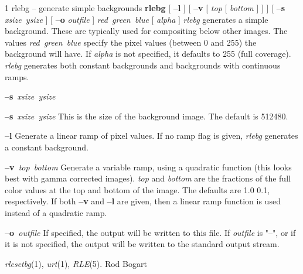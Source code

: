%
%
%
 1
rlebg -- generate simple backgrounds
{\bf rlebg}
[
{\bf --l}
] [
{\bf --v}
[
{\it top}
[
{\it bottom}
] ] ] [
{\bf --s}
{\it xsize\ ysize}
] [ 
{\bf --o}
{\it outfile}
]
{\it red\ green\ blue}
[
{\it alpha}
]
{\it rlebg}
generates a simple background.  These are typically used for compositing
below other images.  The values
{\it red\ green\ blue}
specify the pixel values (between 0 and 255) the background will have.
If 
{\it alpha}
is not specified, it defaults to 255 (full coverage).
{\it rlebg}
generates both constant backgrounds and backgrounds with continuous 
ramps. 
\begin{TPlist}{{\bf --s}{\it \ xsize\ ysize}
}
\item[{{\bf --s}{\it \ xsize\ ysize}
}]
This is the size of the background image.  The default is 512480.
\item[{{\bf --l}}]
Generate a linear ramp of pixel values.  If no ramp flag is given, 
{\it rlebg}
generates a constant background. 
\item[{{\bf --v}{\it \ top\ bottom}
}]
Generate a variable ramp, using a quadratic function (this looks best
with gamma corrected images).
{\it top}
and
{\it bottom}
are the fractions of the full color values at the top and bottom of the image.
The defaults are 1.0 0.1, respectively.  If both 
{\bf --v}
and
{\bf --l}
are given, then a linear ramp function is used instead of a quadratic ramp.
\item[{{\bf --o}{\it \ outfile}
}]
If specified, the output will be written to this file.  If 
{\it outfile}
is "--", or if it is not specified, the output will be written to the
standard output stream.
\end{TPlist}\par\noindent
{}
{\it rlesetbg}{\rm (1),}
{\it urt}{\rm (1),}
{\it RLE}{\rm (5).}
Rod Bogart
\newpage


